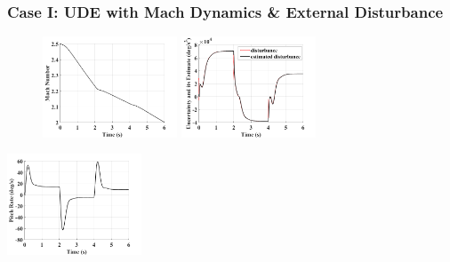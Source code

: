 \documentclass[table,10pt,red]{beamer}	%
\begin{document}
\begin{frame}
\frametitle{Case I: UDE with Mach Dynamics \& External Disturbance}
\begin{figure}
	\includegraphics[width=4cm]{3_ude_varying-mach_mach}
	\includegraphics[width=4cm]{4_ude_varying-mach_dist}
\end{figure}
	\begin{center}
	\includegraphics[width=4cm]{5_ude_varying-mach_pitch}
	\end{center}
\end{frame}
\end{document}
